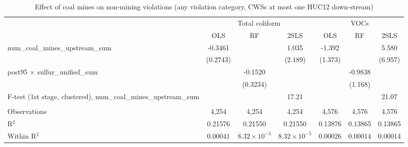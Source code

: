 
\begin{table}[htbp]
   
   \caption{\label{2sls_dwnstrm_nonminevio_allcat_ivsum} Effect of coal mines on non-mining violations (any violation category, CWSs at most one HUC12 down-stream)}
   \bigskip
   
   \centering
   
   \begin{adjustbox}{width = \textwidth, center}
      
      
      \begin{tabular}{lcccccc}
         \toprule
         
          & \multicolumn{3}{c}{Total coliform} & \multicolumn{3}{c}{VOCs}\\
         
                                                                            & OLS           & RF                    & 2SLS                  & OLS           & RF            & 2SLS\\  
         
         \midrule 
         num\_coal\_mines\_upstream\_sum                                    & -0.3461       &                       & 1.035                 & -1.392        &               & 5.580\\   
                                                                            & (0.2743)      &                       & (2.189)               & (1.373)       &               & (6.957)\\   
         post95 $\times$ sulfur\_unified\_sum                               &               & -0.1520               &                       &               & -0.9838       &   \\   
                                                                            &               & (0.3234)              &                       &               & (1.168)       &   \\   
         
         F-test (1st stage, clustered), num\_coal\_mines\_upstream\_sum     &               &                       & 17.21                 &               &               & 21.07\\  
         
          \\
         
         Observations                                                       & 4,254         & 4,254                 & 4,254                 & 4,576         & 4,576         & 4,576\\  
         R$^2$                                                              & 0.21576       & 0.21550               & 0.21550               & 0.13876       & 0.13865       & 0.13865\\  
         Within R$^2$                                                       & 0.00041       & $8.32\times 10^{-5}$  & $8.32\times 10^{-5}$  & 0.00026       & 0.00014       & 0.00014\\  
         

\end{tabular}
\end{adjustbox}
\end{table}

